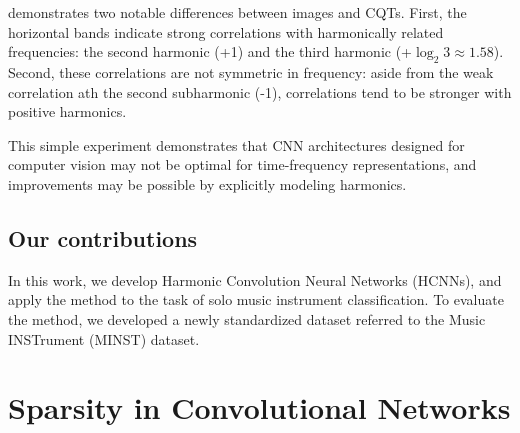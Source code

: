 \documentclass{article}
\begin{document}
 demonstrates two notable differences between images and CQTs.
First, the horizontal bands indicate strong correlations with harmonically related frequencies: the second harmonic (+1) and the third harmonic (+$\log_2 3 \approx 1.58$).
Second, these correlations are not symmetric in frequency: aside from the weak correlation ath the second subharmonic (-1), correlations tend to be stronger with positive harmonics.

This simple experiment demonstrates that CNN architectures designed for computer vision may not be optimal for time-frequency representations, and improvements may be possible by explicitly modeling harmonics.

\subsection{Our contributions}
In this work, we develop Harmonic Convolution Neural Networks (HCNNs), and apply the method to the task of solo music instrument classification.
To evaluate the method, we developed a newly standardized dataset referred to the Music INSTrument (MINST) dataset.


\section{Sparsity in Convolutional Networks}\label{sec:page_size}

\end{document}
